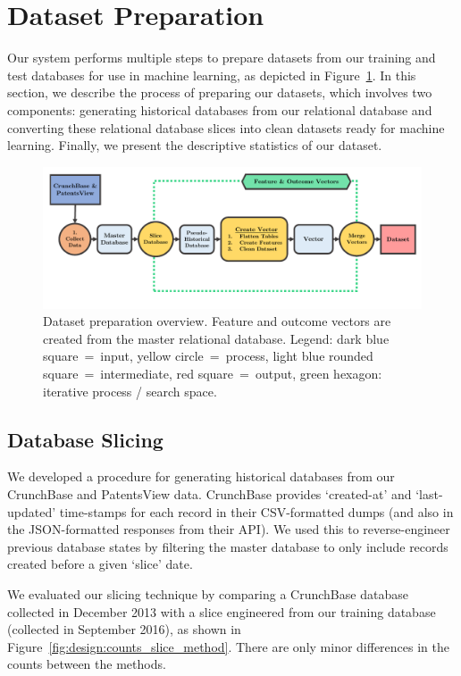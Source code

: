 \documentclass[../thesis/thesis.tex]{subfiles}
\begin{document}
\section{Dataset Preparation}

Our system performs multiple steps to prepare datasets from our training and test databases for use in machine learning, as depicted in Figure~\ref{fig:design:dataset_preparation}. In this section, we describe the process of preparing our datasets, which involves two components: generating historical databases from our relational database and converting these relational database slices into clean datasets ready for machine learning. Finally, we present the descriptive statistics of our dataset.

\begin{figure}[!htb]
    \centering
    \includegraphics[width=\textwidth]{../figures/design/flowchart_dataset_preparation}
    \caption[Dataset preparation flowchart]{Dataset preparation overview. Feature and outcome vectors are created from the master relational database. Legend: dark blue square~=~input, yellow circle~=~process, light blue rounded square~=~intermediate, red square~=~output, green hexagon: iterative process / search space.}
    \label{fig:design:dataset_preparation}
\end{figure}

\subsection{Database Slicing}

We developed a procedure for generating historical databases from our CrunchBase and PatentsView data. CrunchBase provides `created-at' and `last-updated' time-stamps for each record in their CSV-formatted dumps (and also in the JSON-formatted responses from their API). We used this to reverse-engineer previous database states by filtering the master database to only include records created before a given `slice' date.

We evaluated our slicing technique by comparing a CrunchBase database collected in December 2013 with a slice engineered from our training database (collected in September 2016), as shown in Figure~\ref{fig:design:counts_slice_method}. There are only minor differences in the counts between the methods.
\end{document}
